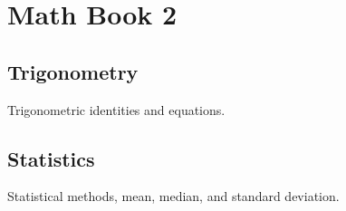 \chapter{Math Book 2}

\section{Trigonometry}
Trigonometric identities and equations.

\section{Statistics}
Statistical methods, mean, median, and standard deviation.
